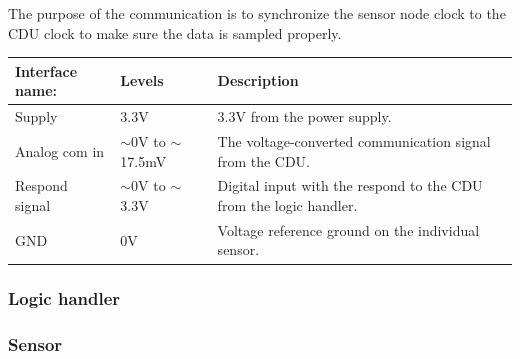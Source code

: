 The purpose of the communication is to synchronize the sensor node clock to the CDU clock to make sure the data is sampled properly.

\begin{table}[H]
	\centering
	\begin{tabular}{|p{3cm} | p{3cm} | p{5cm}| }
		\hline
		Interface name: & 	Levels 								& Description \\ \hline
		Supply			& 	3.3V							 	& 3.3V from the power supply. \\ \hline
		Analog com in	&	$\sim$0V to $\sim$17.5mV 			& The voltage-converted communication signal from the CDU.\\ \hline
		Respond signal  &   $\sim$0V to $\sim$3.3V				& Digital input with the respond to the CDU from the logic handler. \\ \hline
		GND				&	0V									& Voltage reference ground on the individual sensor.\\\hline 
	\end{tabular}
\end{table}


\subsubsection{Logic handler}

\subsubsection{Sensor}